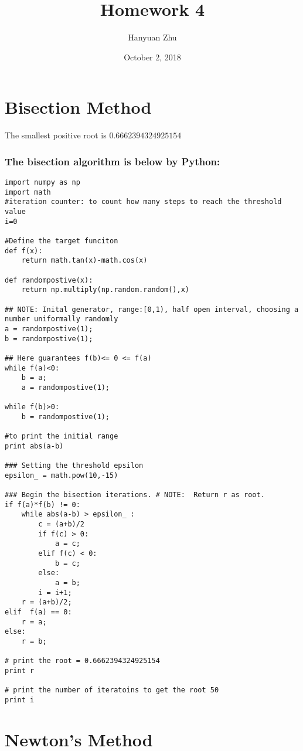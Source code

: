 \documentclass{article}
\title{Homework 4}
\author{Hanyuan Zhu}
\date{October 2, 2018}
\begin{document}
\maketitle

\section{Bisection Method}

The smallest positive root is \textbf{$0.6662394324925154$}

\subsubsection*{The bisection algorithm is below by Python:}
\begin{lstlisting}
import numpy as np
import math
#iteration counter: to count how many steps to reach the threshold value
i=0

#Define the target funciton
def f(x):
    return math.tan(x)-math.cos(x)

def randompostive(x):
    return np.multiply(np.random.random(),x)

## NOTE: Inital generator, range:[0,1), half open interval, choosing a number uniformally randomly
a = randompostive(1);
b = randompostive(1);

## Here guarantees f(b)<= 0 <= f(a)
while f(a)<0:
    b = a;
    a = randompostive(1);

while f(b)>0:
    b = randompostive(1);

#to print the initial range
print abs(a-b)

### Setting the threshold epsilon
epsilon_ = math.pow(10,-15)

### Begin the bisection iterations. # NOTE:  Return r as root.
if f(a)*f(b) != 0:
    while abs(a-b) > epsilon_ :
        c = (a+b)/2
        if f(c) > 0:
            a = c;
        elif f(c) < 0:
            b = c;
        else:
            a = b;
        i = i+1;
    r = (a+b)/2;
elif  f(a) == 0:
    r = a;
else:
    r = b;

# print the root = 0.6662394324925154
print r

# print the number of iteratoins to get the root 50
print i

\end{lstlisting}


\section*{Newton's Method}
\end{document}
